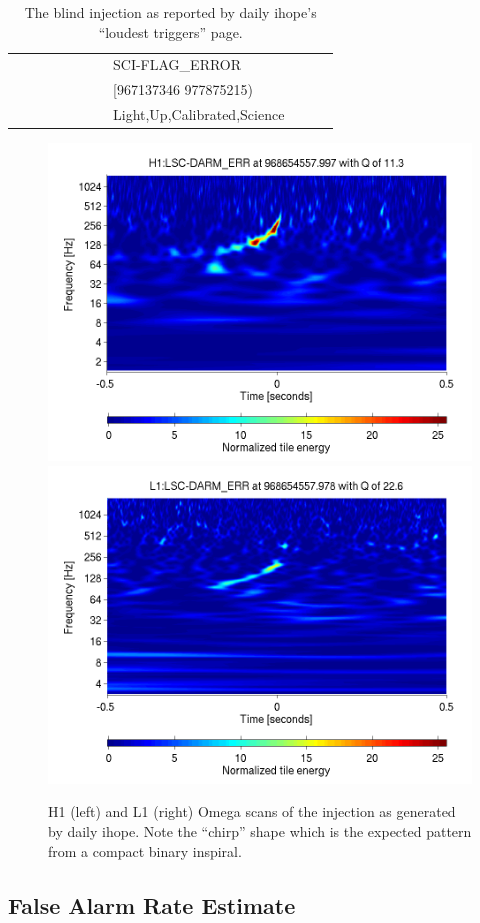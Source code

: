 \begin{landscape}
\begin{table}
\begin{center}
\begin{tabular}{lllllllllll}
    &           &           &    &     &    &     & SCI-FLAG\_ERROR \\
    &           &           &    &     &    &     & \hspace*{0.5 in} [967137346 977875215) \\
    &           &           &    &     &    &     & Light,Up,Calibrated,Science \\
\hline
\end{tabular}
\end{center}
  \caption[Recovered blind injection parameters]{
  \label{tab:daily_ihope_dog}
The blind injection as reported by daily ihope's ``loudest triggers'' page.}
\end{table}
\end{landscape}


\begin{figure}
  \includegraphics[width=0.5\linewidth]{figures/detchar/968654557_997314453_H1_LSC-DARM_ERR_1_00_spectrogram_whitened.png}
  \includegraphics[width=0.5\linewidth]{figures/detchar/968654557_978027343_L1_LSC-DARM_ERR_1_00_spectrogram_whitened.png}
  \caption[Omega scans of the injection]{
  \label{f:daily_ihope_dog_omega}
H1 (left) and L1 (right) Omega scans of the injection as
generated by daily ihope.  Note the ``chirp'' shape which is the
expected pattern from a compact binary inspiral.}
\end{figure}%

\subsection{False Alarm Rate Estimate}


